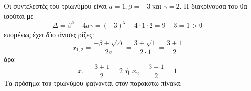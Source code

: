 \begin{alist}
\item Οι συντελεστές του τριωνύμου είναι $ a=1,\beta =-3 $  και $ \gamma=2 $. Η διακρίνουσα του θα ισούται με
\[ \varDelta=\beta^2-4a\gamma=(-3)^2-4\cdot1\cdot2=9-8=1>0 \]
επομένως έχει δύο άνισες ρίζες:
\[ x_{1,2}=\frac{-\beta\pm\sqrt{\varDelta}}{2a}=\frac{3\pm\sqrt{1}}{2\cdot1}=\frac{3\pm 1}{2} \]
άρα
\[ x_1=\frac{3+1}{2}=2\ \ \textrm{ή}\ \ x_2=\frac{3-1}{2}=1 \]
Τα πρόσημα του τριωνύμου φαίνονται στον παρακάτω πίνακα:
\begin{center}
\end{center}
\end{alist}
